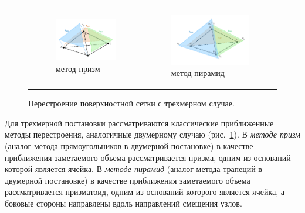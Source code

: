 \documentclass[a4paper,14pt]{extarticle}                     %
\theoremstyle{plain}                                         %
\begin{document}
\begin{figure}[h]
\centering
\begin{tabular}{ll}
\begin{subfigure}{0.4\textwidth}\centering\includegraphics[width=1.0\columnwidth]{pics/text_1_remesh_3d/pic_classical_methods_prisms.pdf}\caption{метод призм}\end{subfigure} &
\begin{subfigure}{0.45\textwidth}\centering\includegraphics[width=1.0\columnwidth]{pics/text_1_remesh_3d/pic_classical_methods_pyramids.pdf}\caption{метод пирамид}\end{subfigure}
\end{tabular}
\singlespacing
\caption{Перестроение поверхностной сетки с трехмерном случае.}
\label{fig:text_1_remesh3}
\end{figure}

Для трехмерной постановки рассматриваются классические приближенные методы перестроения, аналогичные двумерному случаю (рис.~\ref{fig:text_1_remesh3}).
В \textit{методе призм} (аналог метода прямоугольников в двумерной постановке) в качестве приближения заметаемого объема рассматривается призма, одним из оснований которой является ячейка.
В \textit{методе пирамид} (аналог метода трапеций в двумерной постановке) в качестве приближения заметаемого объема рассматривается призматоид, одним из оснований которого является ячейка, а боковые стороны направлены вдоль направлений смещения узлов.
\end{document}
